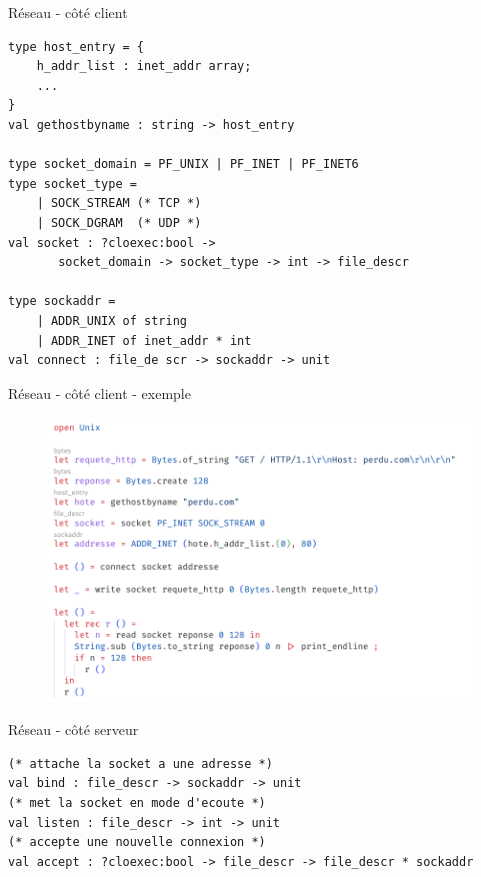 
\begin{frame}[fragile]{Réseau - côté client}

\begin{lstlisting}
type host_entry = {
	h_addr_list : inet_addr array;
    ...
}
val gethostbyname : string -> host_entry

type socket_domain = PF_UNIX | PF_INET | PF_INET6
type socket_type = 
    | SOCK_STREAM (* TCP *) 
    | SOCK_DGRAM  (* UDP *)
val socket : ?cloexec:bool ->
       socket_domain -> socket_type -> int -> file_descr

type sockaddr = 
    | ADDR_UNIX of string
    | ADDR_INET of inet_addr * int
val connect : file_de scr -> sockaddr -> unit
\end{lstlisting}

\end{frame}

\begin{frame}[fragile]{Réseau - côté client - exemple}

\begin{figure}
    \centering
    \includegraphics[width=\textwidth]{slides/images/unixsocket.png}
\end{figure}
    
\end{frame}

\begin{frame}[fragile]{Réseau - côté serveur}

\begin{lstlisting}
(* attache la socket a une adresse *)
val bind : file_descr -> sockaddr -> unit
(* met la socket en mode d'ecoute *)
val listen : file_descr -> int -> unit
(* accepte une nouvelle connexion *)
val accept : ?cloexec:bool -> file_descr -> file_descr * sockaddr
\end{lstlisting}

\end{frame}

